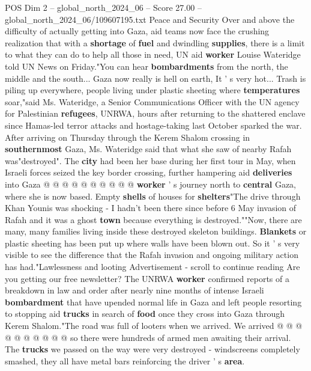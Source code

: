 \begin{textsample}{POS Dim 2 – global\_north\_2024\_06 – Score 27.00 – global\_north\_2024\_06/109607195.txt}  \label{ex:f2_pos_260}
Peace and Security Over and above the difficulty of actually getting into Gaza, aid teams now face the crushing realization that with a \textbf{shortage} of \textbf{fuel} and dwindling \textbf{supplies}, there is a limit to what they can do to help all those in need, UN aid \textbf{worker} Louise Wateridge told UN News on Friday."You can hear \textbf{bombardments} from the north, the middle and the south...
Gaza now really is hell on earth, It ' s very hot...
Trash is piling up everywhere, people living under plastic sheeting where \textbf{temperatures} soar,"said Ms.
Wateridge, a Senior Communications Officer with the UN agency for Palestinian \textbf{refugees}, UNRWA, hours after returning to the shattered enclave since Hamas-led terror attacks and hostage-taking last October sparked the war.
After arriving on Thursday through the Kerem Shalom crossing in \textbf{southernmost} Gaza, Ms.
Wateridge said that what she saw of nearby Rafah was"destroyed".
The \textbf{city} had been her base during her first tour in May, when Israeli forces seized the key border crossing, further hampering aid \textbf{deliveries} into Gaza @ @ @ @ @ @ @ @ @ @ \textbf{worker} ' s journey north to \textbf{central} Gaza, where she is now based.
Empty \textbf{shells} of houses for \textbf{shelters}"The drive through Khan Younis was shocking - I hadn't been there since before 6 May invasion of Rafah and it was a ghost \textbf{town} because everything is destroyed.""Now, there are many, many families living inside these destroyed skeleton buildings. \textbf{Blankets} or plastic sheeting has been put up where walls have been blown out.
So it ' s very visible to see the difference that the Rafah invasion and ongoing military action has had."Lawlessness and looting Advertisement - scroll to continue reading Are you getting our free newsletter?
The UNRWA \textbf{worker} confirmed reports of a breakdown in law and order after nearly nine months of intense Israeli \textbf{bombardment} that have upended normal life in Gaza and left people resorting to stopping aid \textbf{trucks} in search of \textbf{food} once they cross into Gaza through Kerem Shalom."The road was full of looters when we arrived.
We arrived @ @ @ @ @ @ @ @ @ @ so there were hundreds of armed men awaiting their arrival.
The \textbf{trucks} we passed on the way were very destroyed - windscreens completely smashed, they all have metal bars reinforcing the driver ' s \textbf{area}.

\end{textsample}
